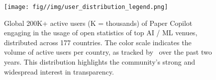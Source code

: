 \begin{figure}
    \centering
    \texttt{[image: fig//img/user\_distribution\_legend.png]}
    \caption{Global 200K+ active users (K = thousands) of Paper Copilot engaging in the usage of open statistics of top AI / ML venues, distributed across 177 countries. The color scale indicates the volume of active users per country, as tracked by~\citet{googleanalytics} over the past two years. This distribution highlights the community's strong and widespread interest in transparency.}
    \vspace{-10pt}
    \label{fig:active_user_distribution}
\end{figure}